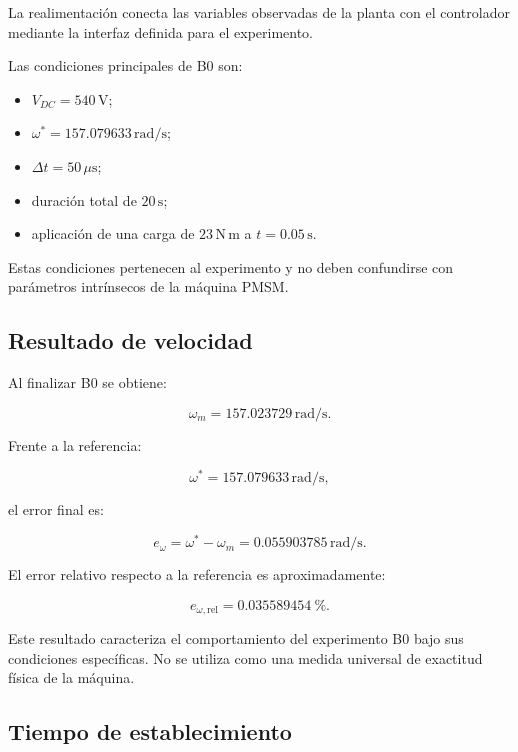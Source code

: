 La realimentación conecta las variables observadas de la planta con el controlador mediante la interfaz definida para el experimento.

Las condiciones principales de B0 son:

\begin{itemize}
    \item $V_{DC}=540\,\mathrm{V}$;
    \item $\omega^\ast=157.079633\,\mathrm{rad/s}$;
    \item $\Delta t=50\,\mu\mathrm{s}$;
    \item duración total de $20\,\mathrm{s}$;
    \item aplicación de una carga de $23\,\mathrm{N\,m}$ a $t=0.05\,\mathrm{s}$.
\end{itemize}

Estas condiciones pertenecen al experimento y no deben confundirse con parámetros intrínsecos de la máquina PMSM.

\subsection{Resultado de velocidad}

Al finalizar B0 se obtiene:

\begin{equation}
\omega_m=
157.023729\,\mathrm{rad/s}.
\end{equation}

Frente a la referencia:

\begin{equation}
\omega^\ast=
157.079633\,\mathrm{rad/s},
\end{equation}

el error final es:

\begin{equation}
e_\omega=
\omega^\ast-\omega_m
=
0.055903785\,\mathrm{rad/s}.
\end{equation}

El error relativo respecto a la referencia es aproximadamente:

\begin{equation}
e_{\omega,\mathrm{rel}}
=
\SI{0.035589454}{\percent}.
\end{equation}

Este resultado caracteriza el comportamiento del experimento B0 bajo sus condiciones específicas. No se utiliza como una medida universal de exactitud física de la máquina.

\subsection{Tiempo de establecimiento}

